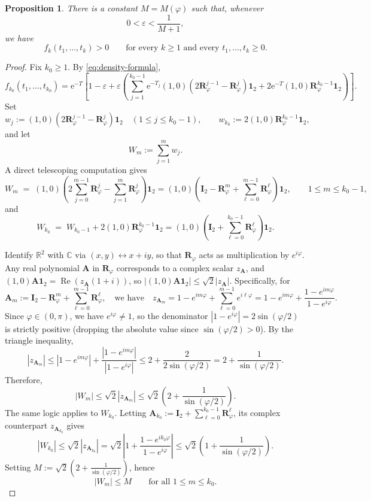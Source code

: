 \documentclass[11pt]{article}
\newtheorem{proposition}[theorem]{Proposition}
\theoremstyle{definition}
\theoremstyle{remark}
\newcommand{\e}{\mathrm{e}}
\begin{document}
\begin{proposition}\label{prop:positivity}
There is a constant $M=M(\varphi)$ such that, whenever
\[
0<\varepsilon<\frac{1}{M+1},
\]
we have
\[
f_k(t_1,\dots,t_k)>0
\qquad\text{for every }k\ge 1\text{ and every }t_1,\dots,t_k\ge 0.
\]
\end{proposition}
\begin{proof}
Fix $k_0\ge 1$. By \eqref{eq:density-formula},
\[
f_{k_0}(t_1,\dots,t_{k_0})
=
\e^{-T}
\left[
1-\varepsilon
+
\varepsilon
\left(
\sum_{j=1}^{{k_0}-1}
\e^{-T_j}(1,0)(2\bm{R}_\varphi^{j-1}-\bm{R}_\varphi^j)\bm{1}_2
+
2\e^{-T}(1,0)\bm{R}_\varphi^{{k_0}-1}\bm{1}_2
\right)
\right].
\]
Set
\[
w_j:=(1,0)(2\bm{R}_\varphi^{j-1}-\bm{R}_\varphi^j)\bm{1}_2
\quad (1\le j\le {k_0}-1),
\qquad
w_{k_0}:=2(1,0)\bm{R}_\varphi^{{k_0}-1}\bm{1}_2,
\]
and let
\[
W_m:=\sum_{j=1}^m w_j.
\]
A direct telescoping computation gives
\[
W_m
\;=\; (1,0)\left( 2\sum_{j=0}^{m-1}\bm{R}_\varphi^j - \sum_{j=1}^{m}\bm{R}_\varphi^j \right)\bm{1}_2
=
(1,0)\left(\bm{I}_2-\bm{R}_\varphi^m+\sum_{\ell=0}^{m-1}\bm{R}_\varphi^\ell\right)\bm{1}_2,
\qquad 1\le m\le {k_0}-1,
\]
and
\[
W_{k_0}
\;=\; W_{k_0-1} + 2(1,0)\bm{R}_\varphi^{k_0-1}\bm{1}_2
=
(1,0)\left(\bm{I}_2+\sum_{\ell=0}^{{k_0}-1}\bm{R}_\varphi^\ell\right)\bm{1}_2.
\]

Identify $\mathbb{R}^2$ with $\mathbb{C}$ via $(x,y)\leftrightarrow x+iy$, so that $\bm{R}_\varphi$ acts as multiplication by $e^{i\varphi}$. Any real polynomial $\bm{A}$ in $\bm{R}_\varphi$ corresponds to a complex scalar $z_{\bm{A}}$, and $(1,0)\bm{A}\bm{1}_2 = \operatorname{Re}(z_{\bm{A}}(1+i))$, so $|(1,0)\bm{A}\bm{1}_2|\le\sqrt{2}|z_{\bm{A}}|$. Specifically, for
\[
\bm{A}_m := \bm{I}_2-\bm{R}_\varphi^m+\sum_{\ell=0}^{m-1}\bm{R}_\varphi^\ell,
\quad\mbox{we have}\quad
z_{\bm{A}_m} = 1-e^{im\varphi}+\sum_{\ell=0}^{m-1}e^{i\ell\varphi} = 1-e^{im\varphi}+\frac{1-e^{im\varphi}}{1-e^{i\varphi}}.
\]
Since \(\varphi\in(0,\pi)\), we have \(e^{i\varphi}\neq 1\), so the denominator \(|1-e^{i\varphi}|=2\sin(\varphi/2)\) is strictly positive (dropping the absolute value since \(\sin(\varphi/2)>0\)). By the triangle inequality,
\[
|z_{\bm{A}_m}|
\le
|1-e^{im\varphi}|+\frac{|1-e^{im\varphi}|}{|1-e^{i\varphi}|}
\le
2+\frac{2}{2\sin(\varphi/2)}
=
2+\frac{1}{\sin(\varphi/2)}.
\]
Therefore,
\[
|W_m| \le \sqrt{2}|z_{\bm{A}_m}| \le \sqrt{2}\left(2+\frac{1}{\sin(\varphi/2)}\right).
\]
The same logic applies to \(W_{k_0}\). Letting \(\bm{A}_{k_0} := \bm{I}_2+\sum_{\ell=0}^{k_0-1}\bm{R}_\varphi^\ell\), its complex counterpart \(z_{\bm{A}_{k_0}}\) gives
\[
|W_{k_0}|
\le
\sqrt{2}|z_{\bm{A}_{k_0}}|
=
\sqrt{2}\left|1+\frac{1-e^{ik_0\varphi}}{1-e^{i\varphi}}\right|
\le
\sqrt{2}\left(1+\frac{1}{\sin(\varphi/2)}\right).
\]
Setting \(M:=\sqrt{2}\left(2+\frac{1}{\sin(\varphi/2)}\right)\), hence
\[
|W_m|\le M
\qquad\text{for all }1\le m\le k_0.
\]


\end{proof}
\end{document}
